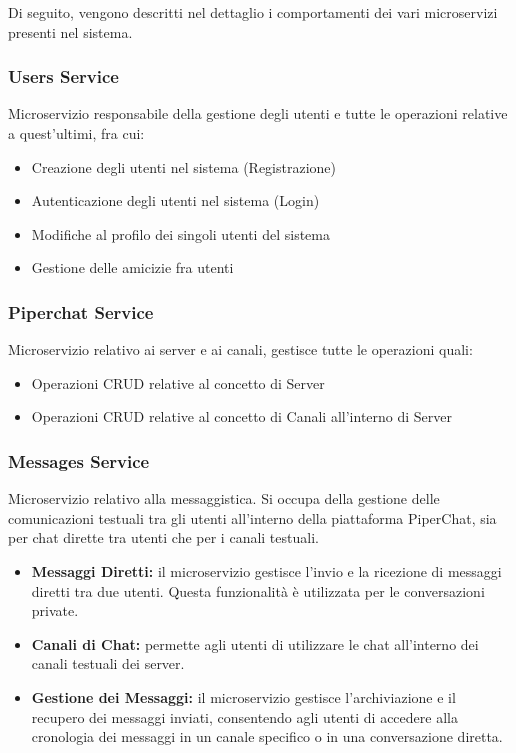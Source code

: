 
Di seguito, vengono descritti nel dettaglio i comportamenti dei vari microservizi presenti nel sistema.

%
%
%
\subsubsection{Users Service}

Microservizio responsabile della gestione degli utenti e tutte le operazioni relative a quest'ultimi, fra cui:

\begin{itemize}
    \item Creazione degli utenti nel sistema (Registrazione)
    \item Autenticazione degli utenti nel sistema (Login)
    \item Modifiche al profilo dei singoli utenti del sistema
    \item Gestione delle amicizie fra utenti
\end{itemize}

%
%
%
\subsubsection{Piperchat Service}

Microservizio relativo ai server e ai canali, gestisce tutte le operazioni quali:

\begin{itemize}
    \item Operazioni CRUD relative al concetto di Server
    \item Operazioni CRUD relative al concetto di Canali all'interno di Server
\end{itemize}

%
%
%
\subsubsection{Messages Service}

Microservizio relativo alla messaggistica.
%
Si occupa della gestione delle comunicazioni testuali tra gli utenti all'interno della piattaforma PiperChat, sia per chat dirette tra utenti che per i canali testuali.

\begin{itemize}
    \item \textbf{Messaggi Diretti:} il microservizio gestisce l'invio e la ricezione di messaggi diretti tra due utenti. Questa funzionalità è utilizzata per le conversazioni private.
    
    \item \textbf{Canali di Chat:} permette agli utenti di utilizzare le chat all'interno dei canali testuali dei server.

    \item \textbf{Gestione dei Messaggi:} il microservizio gestisce l'archiviazione e il recupero dei messaggi inviati, consentendo agli utenti di accedere alla cronologia dei messaggi in un canale specifico o in una conversazione diretta.
\end{itemize}

